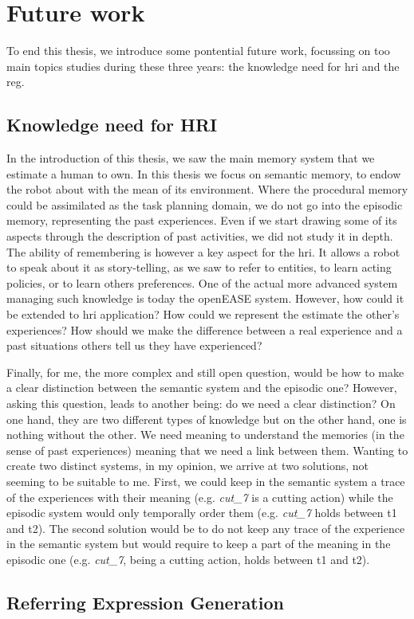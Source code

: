 \section*{Future work}

To end this thesis, we introduce some pontential future work, focussing on too main topics studies during these three years: the knowledge need for \acrshort{hri} and the \acrshort{reg}.

\subsection*{Knowledge need for HRI}

In the introduction of this thesis, we saw the main memory system that we estimate a human to own. In this thesis we focus on semantic memory, to endow the robot about with the mean of its environment. Where the procedural memory could be assimilated as the task planning domain, we do not go into the episodic memory, representing the past experiences. Even if we start drawing some of its aspects through the description of past activities, we did not study it in depth. The ability of remembering is however a key aspect for the \acrshort{hri}. It allows a robot to speak about it as story-telling, as we saw to refer to entities, to learn acting policies, or to learn others preferences. One of the actual more advanced system managing such knowledge is today the openEASE system. However, how could it be extended to \acrshort{hri} application? How could we represent the estimate the other's experiences? How should we make the difference between a real experience and a past situations others tell us they have experienced?

Finally, for me, the more complex and still open question, would be how to make a clear distinction between the semantic system and the episodic one? However, asking this question, leads to another being: do we need a clear distinction? On one hand, they are two different types of knowledge but on the other hand, one is nothing without the other. We need meaning to understand the memories (in the sense of past experiences) meaning that we need a link between them. Wanting to create two distinct systems, in my opinion, we arrive at two solutions, not seeming to be suitable to me. First, we could keep in the semantic system a trace of the experiences with their meaning (e.g. \textit{cut\_7} is a cutting action) while the episodic system would only temporally order them (e.g. \textit{cut\_7} holds between t1 and t2). The second solution would be to do not keep any trace of the experience in the semantic system but would require to keep a part of the meaning in the episodic one (e.g. \textit{cut\_7}, being a cutting action, holds between t1 and t2).

\subsection*{Referring Expression Generation}
